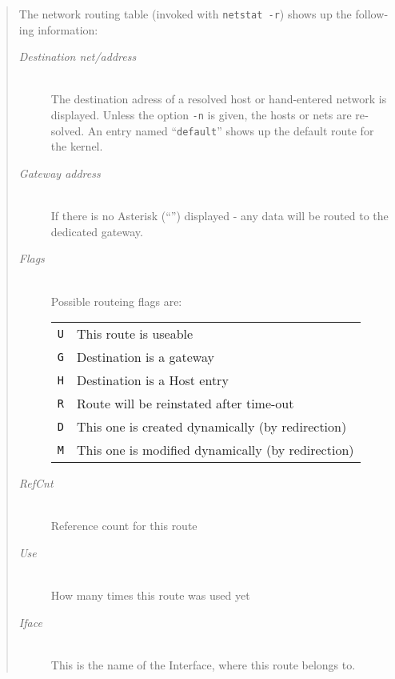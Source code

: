 \begin{appendix}
\begin{english}
\begin{quote}
	The network routing table (invoked with {\tt netstat -r}) shows up
	the following information:
	\begin{description}
		\item[{\sl Destination net/address}]\mbox{}\\
			The destination adress of a resolved host or hand-entered
			network is displayed. Unless the option {\tt -n} is given, the
			hosts or nets are resolved. An entry named ``{\tt default}'' shows
			up the default route for the kernel.
		\item[{\sl Gateway address}]\mbox{}\\
			If there is no Asterisk (``{\tt *}'') displayed - any data will be
			routed to the dedicated gateway.
		\item[{\sl Flags}]\mbox{}\\
			Possible routeing flags are:\\
			\begin{tabular}{lp{8cm}}
				{\tt U} & This route is useable \\
				{\tt G} & Destination is a gateway \\
				{\tt H} & Destination is a Host entry \\
				{\tt R} & Route will be reinstated after time-out \\
				{\tt D} & This one is created dynamically (by redirection) \\
				{\tt M} & This one is modified dynamically (by redirection)
			\end{tabular}
		\item[{\sl RefCnt}]\mbox{}\\
			Reference count for this route
		\item[{\sl Use}]\mbox{}\\
			How many times this route was used yet
		\item[{\sl Iface}]\mbox{}\\
			This is the name of the Interface, where this route
			belongs to.
	\end{description}


\end{quote}
\end{english}
\end{appendix}
